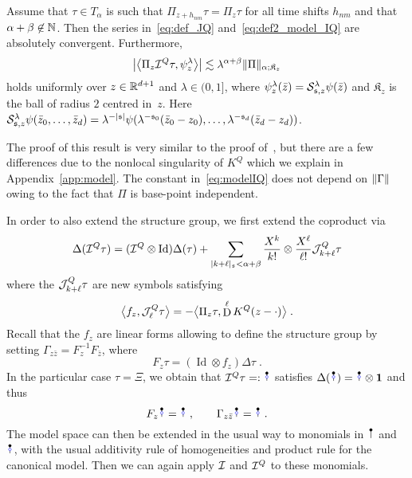 \documentclass[reqno,11pt]{article}
\def\unit{\vone}
\DeclareMathOperator{\Id}{Id}           %
\def\fraks{\mathfrak{s}}
\def\fraK{\mathfrak{K}}
\def\abss#1{\abs{#1}_\mathfrak{s}}
\DeclareMathOperator{\D}{D}            %
\begin{document}
\begin{lemma}
\label{lem:modelIQ} 
Assume that $\tau\in T_\alpha$ is such that $\Pi_{z+h_{nm}}\tau = \Pi_z\tau$ for 
all time shifts $h_{nm}$ and that $\alpha+\beta\not\in\mathbb{N}$. Then the series 
in~\eqref{eq:def_JQ} and~\eqref{eq:def2_model_IQ} are absolutely convergent. 
Furthermore, 
\begin{equation}
\label{eq:modelIQ} 
 \bigabs{\bigpscal{\Pi_z\cI^Q\tau}{\psi^\lambda_z}} 
 \lesssim \lambda^{\alpha+\beta} \norm{\Pi}_{\alpha;\fraK_z}
\end{equation} 
holds uniformly over $z\in\mathbb{R}^{d+1}$ and $\lambda\in(0,1]$, where
$\psi^\lambda_z(\bar z) = \cS^\lambda_{\fraks,z}\psi(\bar z)$ and 
$\fraK_z$ is the ball of radius $2$ centred in~$z$.
Here $\cS^\lambda_{\fraks,z}\psi(\bar z_0,\dots,\bar z_d)
= \lambda^{-\abs{\fraks}}\psi(\lambda^{-\fraks_0}(\bar z_0-z_0), 
\dots, \lambda^{-\fraks_d}(\bar z_d-z_d))$.
\end{lemma}

The proof of this result is very similar to the proof
of~\cite[Lem.~5.19]{Hairer2014}, but there are a few differences due to the
nonlocal singularity of $K^Q$ which we explain in Appendix~\ref{app:model}. The
constant in~\eqref{eq:modelIQ} does not depend on $\lVert\Gamma\rVert$ owing to the
fact that $\Pi$ is base-point independent. 

In order to also extend the structure group, we first extend the coproduct via 
\begin{equation}
\label{eq:DeltaIQ} 
 \Delta(\cI^Q\tau) = (\cI^Q\otimes\Id) \Delta(\tau) 
 + \sum_{\abss{k+\ell} < \alpha+\beta} 
 \frac{X^k}{k!} \otimes \frac{X^\ell}{\ell!} \cJ^Q_{k+\ell}\tau
\end{equation} 
where the ${\mathcal J}^Q_{k+\ell}\tau$ are new symbols satisfying 
\begin{equation}
 \bigpscal{f_z}{\cJ^Q_\ell\tau} = 
 - \bigpscal{\Pi_z\tau}{\D^\ell K^Q(z-\cdot)}\;.
\end{equation} 
Recall that the $f_z$ are linear forms allowing to define the 
structure group by setting $\Gamma_{z\bar z} = F_z^{-1}F_{\bar z}$, where
\begin{equation}
 F_z \tau = (\Id\otimes f_z)\Delta\tau\;.
\end{equation} 
In the particular case $\tau=\Xi$, we obtain that $\cI^Q\tau =: \RSoI$ satisfies
$\Delta(\RSoI) = \RSoI \otimes \unit$ and thus 
\begin{equation}
 F_z \RSoI = \RSoI\;, \qquad 
 \Gamma_{z\bar z} \RSoI = \RSoI\;.
\end{equation} 
The model space can then be extended in the usual way to monomials in $\RSI$
and $\RSoI$, with the usual additivity rule of homogeneities and product rule
for the canonical model. Then we can again apply ${\mathcal I}$ and ${\mathcal I}^Q$ to these
monomials. 
\end{document}
